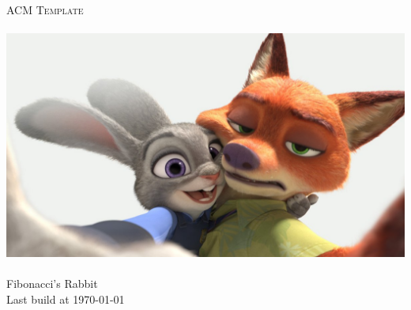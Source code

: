 \begin{titlepage}
	\pagestyle{empty}
  \begin{center}
		~\\[80pt]
    \fontsize{48pt}{\baselineskip}\selectfont  \textsc{ACM Template}\\[8pt]
    ~\\[60pt]
    \includegraphics[width=1\textwidth]{cover.jpg}
    ~\\[100pt]
    \huge Fibonacci's Rabbit\\[8pt]
    \Large Last build at \today
  \end{center}
\end{titlepage}
\restoregeometry